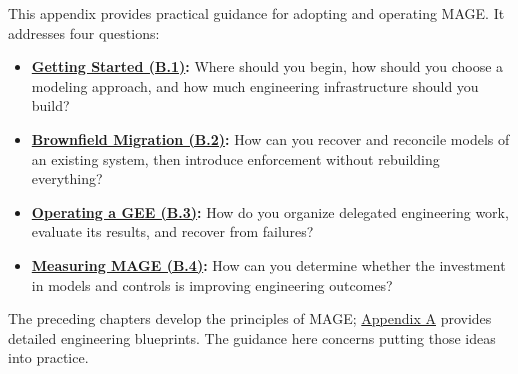 
This appendix provides practical guidance for adopting and operating MAGE. It addresses four questions:

\begin{itemize}
\item \textbf{\href{appendix-b-getting-started.html}{Getting Started (B.1)}:} Where should you begin, how should you choose a modeling approach, and how much engineering infrastructure should you build?
\item \textbf{\href{appendix-b-brownfield-migration.html}{Brownfield Migration (B.2)}:} How can you recover and reconcile models of an existing system, then introduce enforcement without rebuilding everything?
\item \textbf{\href{appendix-b-operating-a-gee.html}{Operating a GEE (B.3)}:} How do you organize delegated engineering work, evaluate its results, and recover from failures?
\item \textbf{\href{appendix-b-measuring-mage.html}{Measuring MAGE (B.4)}:} How can you determine whether the investment in models and controls is improving engineering outcomes?
\end{itemize}

The preceding chapters develop the principles of MAGE; \href{appendix-handbook.html}{Appendix A} provides detailed engineering blueprints. The guidance here concerns putting those ideas into practice.
